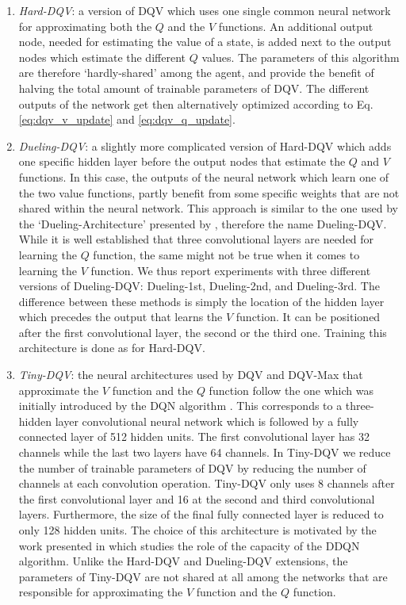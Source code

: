 \begin{enumerate}
    \item \textit{Hard-DQV}: a version of DQV which uses one single common neural network for approximating both the $Q$ and the $V$ functions. An additional output node, needed for estimating the value of a state, is added next to the output nodes which estimate the different $Q$ values. The parameters of this algorithm are therefore `hardly-shared' among the agent, and provide the benefit of halving the total amount of trainable parameters of DQV. The different outputs of the network get then alternatively optimized according to Eq. \ref{eq:dqv_v_update} and \ref{eq:dqv_q_update}.

    \item \textit{Dueling-DQV}: a slightly more complicated version of Hard-DQV which adds one specific hidden layer before the output nodes that estimate the $Q$ and $V$ functions. In this case, the outputs of the neural network which learn one of the two value functions, partly benefit from some specific weights that are not shared within the neural network. This approach is similar to the one used by the `Dueling-Architecture' presented by \citet{wang2016dueling}, therefore the name Dueling-DQV. While it is well established that three convolutional layers are needed \cite{mnih2015human, van2016deep} for learning the $Q$ function, the same might not be true when it comes to learning the $V$ function. We thus report experiments with three different versions of Dueling-DQV: Dueling-1st, Dueling-2nd, and Dueling-3rd. The difference between these methods is simply the location of the hidden layer which precedes the output that learns the $V$ function. It can be positioned after the first convolutional layer, the second or the third one. Training this architecture is done as for Hard-DQV.

    \item \textit{Tiny-DQV}: the neural architectures used by DQV and DQV-Max that approximate the $V$ function and the $Q$ function follow the one which was initially introduced by the DQN algorithm \cite{mnih2015human}. This corresponds to a three-hidden layer convolutional neural network which is followed by a fully connected layer of 512 hidden units. The first convolutional layer has 32 channels while the last two layers have 64 channels. In Tiny-DQV we reduce the number of trainable parameters of DQV by reducing the number of channels at each convolution operation. Tiny-DQV only uses 8 channels after the first convolutional layer and 16 at the second and third convolutional layers. Furthermore, the size of the final fully connected layer is reduced to only 128 hidden units. The choice of this architecture is motivated by the work presented in \cite{van2018deep_triad} which studies the role of the capacity of the DDQN algorithm. Unlike the Hard-DQV and Dueling-DQV extensions, the parameters of Tiny-DQV are not shared at all among the networks that are responsible for approximating the $V$ function and the $Q$ function.
\end{enumerate}

